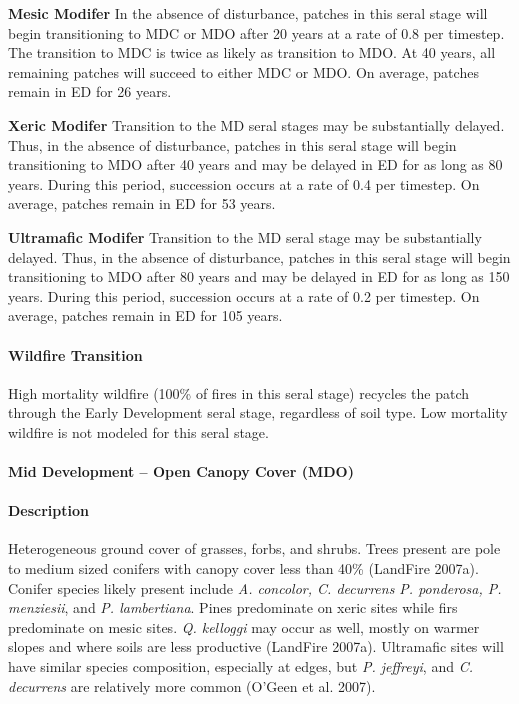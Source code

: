 \begin{adjustwidth}{2cm}{}
\textbf{Mesic Modifer } In the absence of disturbance, patches in this seral stage will begin transitioning to MDC or MDO after 20 years at a rate of 0.8 per timestep. The transition to MDC is twice as likely as transition to MDO.  At 40 years, all remaining patches will succeed to either MDC or MDO. On average, patches remain in ED for 26 years.

\textbf{Xeric Modifer}  Transition to the MD seral stages may be substantially delayed. Thus, in the absence of disturbance, patches in this seral stage will begin transitioning to MDO after 40 years and may be delayed in ED for as long as 80 years. During this period, succession occurs at a rate of 0.4 per timestep. On average, patches remain in ED for 53 years.

\textbf{Ultramafic Modifer}  Transition to the MD seral stage may be substantially delayed. Thus, in the absence of disturbance, patches in this seral stage will begin transitioning to MDO after 80 years and may be delayed in ED for as long as 150 years. During this period, succession occurs at a rate of 0.2 per timestep. On average, patches remain in ED for 105 years.

\end{adjustwidth}



\paragraph{Wildfire Transition} High mortality wildfire (100\% of fires in this seral stage) recycles the patch through the Early Development seral stage, regardless of soil type. Low mortality wildfire is not modeled for this seral stage. 

\noindent\hrulefill


\paragraph{Mid Development – Open Canopy Cover (MDO)} 

\paragraph{Description} Heterogeneous ground cover of grasses, forbs, and shrubs. Trees present are pole to medium sized conifers with canopy cover less than 40\% (LandFire 2007a). Conifer species likely present include \emph{A. concolor, C. decurrens P. ponderosa, P. menziesii}, and \emph{P. lambertiana}. Pines predominate on xeric sites while firs predominate on mesic sites. \emph{Q. kelloggi} may occur as well, mostly on warmer slopes and where soils are less productive (LandFire 2007a). Ultramafic sites will have similar species composition, especially at edges, but \emph{P. jeffreyi}, and \emph{C. decurrens} are relatively more common (O’Geen et al. 2007).

